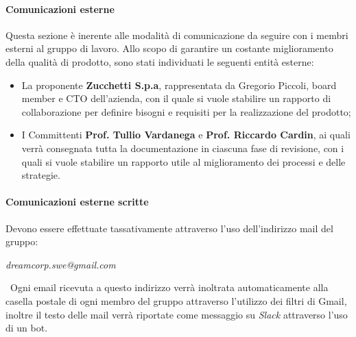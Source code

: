             \paragraph{Comunicazioni esterne}
                Questa sezione è inerente alle modalità di comunicazione da seguire con i membri esterni al gruppo di lavoro.
                \newline
                Allo scopo di garantire un costante miglioramento della qualità di prodotto, sono stati individuati le seguenti entità esterne:
                \begin{itemize}
                    \item La proponente \textbf{Zucchetti S.p.a}, rappresentata da Gregorio Piccoli, board member e CTO dell'azienda, con il quale si vuole stabilire un rapporto di collaborazione per definire bisogni e requisiti per la realizzazione del prodotto;
                    \item I Committenti \textbf{Prof. Tullio Vardanega} e \textbf{Prof. Riccardo Cardin}, ai quali verrà consegnata tutta la documentazione in ciascuna fase di revisione, con i quali si vuole stabilire un rapporto utile al miglioramento dei processi e delle strategie.
                \end{itemize}
                \paragraph{Comunicazioni esterne scritte} Devono essere effettuate tassativamente attraverso l'uso dell'indirizzo mail del gruppo:
                \newline
                \begin{center}
                	\textit{dreamcorp.swe@gmail.com}
                \end{center}
                
    ~\newline Ogni email ricevuta a questo indirizzo verrà inoltrata automaticamente alla casella postale di ogni membro del gruppo attraverso l'utilizzo dei filtri di Gmail\pedice, inoltre il testo delle mail verrà riportate come messaggio su \textit{Slack} attraverso l'uso di un bot.
